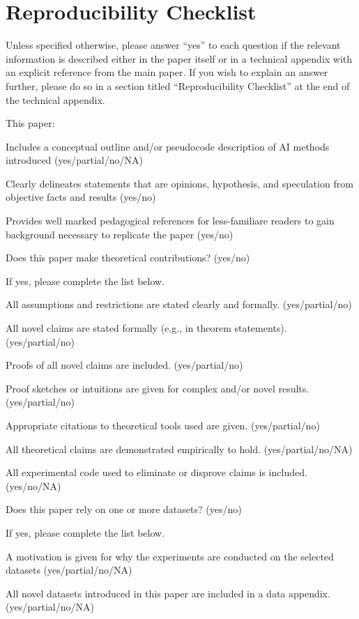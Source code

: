 \section{Reproducibility Checklist}

Unless specified otherwise, please answer ``yes'' to each question if the relevant information is described either in the paper itself or in a technical appendix with an explicit reference from the main paper. If you wish to explain an answer further, please do so in a section titled ``Reproducibility Checklist'' at the end of the technical appendix.

This paper:

Includes a conceptual outline and/or pseudocode description of AI methods introduced (yes/partial/no/NA)

Clearly delineates statements that are opinions, hypothesis, and speculation from objective facts and results (yes/no)

Provides well marked pedagogical references for less-familiare readers to gain background necessary to replicate the paper (yes/no)

Does this paper make theoretical contributions? (yes/no)

If yes, please complete the list below.

All assumptions and restrictions are stated clearly and formally. (yes/partial/no)

All novel claims are stated formally (e.g., in theorem statements). (yes/partial/no)

Proofs of all novel claims are included. (yes/partial/no)

Proof sketches or intuitions are given for complex and/or novel results. (yes/partial/no)

Appropriate citations to theoretical tools used are given. (yes/partial/no)

All theoretical claims are demonstrated empirically to hold. (yes/partial/no/NA)

All experimental code used to eliminate or disprove claims is included. (yes/no/NA)

Does this paper rely on one or more datasets? (yes/no)

If yes, please complete the list below.

A motivation is given for why the experiments are conducted on the selected datasets (yes/partial/no/NA)

All novel datasets introduced in this paper are included in a data appendix. (yes/partial/no/NA)

